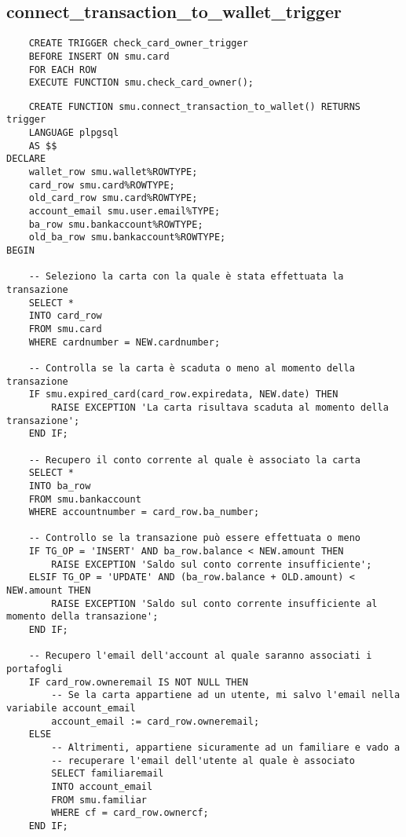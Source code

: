 \subsection{connect\_transaction\_to\_wallet\_trigger}

\begin{lstlisting}
    CREATE TRIGGER check_card_owner_trigger 
    BEFORE INSERT ON smu.card 
    FOR EACH ROW 
    EXECUTE FUNCTION smu.check_card_owner();
\end{lstlisting}

\begin{lstlisting}
    CREATE FUNCTION smu.connect_transaction_to_wallet() RETURNS trigger
    LANGUAGE plpgsql
    AS $$
DECLARE
    wallet_row smu.wallet%ROWTYPE;
    card_row smu.card%ROWTYPE;
    old_card_row smu.card%ROWTYPE;
    account_email smu.user.email%TYPE;
    ba_row smu.bankaccount%ROWTYPE;
    old_ba_row smu.bankaccount%ROWTYPE;
BEGIN

    -- Seleziono la carta con la quale è stata effettuata la transazione
    SELECT *
    INTO card_row
    FROM smu.card
    WHERE cardnumber = NEW.cardnumber;

    -- Controlla se la carta è scaduta o meno al momento della transazione
    IF smu.expired_card(card_row.expiredata, NEW.date) THEN
        RAISE EXCEPTION 'La carta risultava scaduta al momento della transazione';
    END IF;

    -- Recupero il conto corrente al quale è associato la carta
    SELECT *
    INTO ba_row
    FROM smu.bankaccount
    WHERE accountnumber = card_row.ba_number;
    
    -- Controllo se la transazione può essere effettuata o meno
    IF TG_OP = 'INSERT' AND ba_row.balance < NEW.amount THEN
        RAISE EXCEPTION 'Saldo sul conto corrente insufficiente';
    ELSIF TG_OP = 'UPDATE' AND (ba_row.balance + OLD.amount) < NEW.amount THEN
        RAISE EXCEPTION 'Saldo sul conto corrente insufficiente al momento della transazione';
    END IF;

    -- Recupero l'email dell'account al quale saranno associati i portafogli
    IF card_row.owneremail IS NOT NULL THEN
        -- Se la carta appartiene ad un utente, mi salvo l'email nella variabile account_email
        account_email := card_row.owneremail;
    ELSE
        -- Altrimenti, appartiene sicuramente ad un familiare e vado a
        -- recuperare l'email dell'utente al quale è associato
        SELECT familiaremail
        INTO account_email
        FROM smu.familiar
        WHERE cf = card_row.ownercf;
    END IF;


\end{lstlisting}
